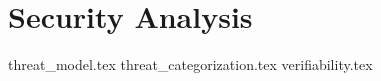 \section{Security Analysis}%
\label{sec:security_analysis}

{threat_model.tex}
{threat_categorization.tex}
{verifiability.tex}
